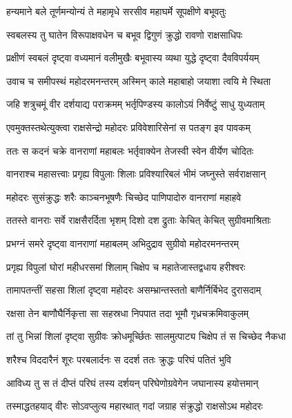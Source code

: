 
\twolineshloka
{हन्यमाने बले तूर्णमन्योन्यं ते महामृधे}
{सरसीव महाघर्मे सूपक्षीणे बभूवतुः} %

\twolineshloka
{स्वबलस्य तु घातेन विरूपाक्षवधेन च}
{बभूव द्विगुणं क्रुद्धो रावणो राक्षसाधिपः} %

\twolineshloka
{प्रक्षीणं स्वबलं दृष्ट्वा वध्यमानं वलीमुखैः}
{बभूवास्य व्यथा युद्धे दृष्ट्वा दैवविपर्ययम्} %

\twolineshloka
{उवाच च समीपस्थं महोदरमनन्तरम्}
{अस्मिन् काले महाबाहो जयाशा त्वयि मे स्थिता} %

\twolineshloka
{जहि शत्रुचमूं वीर दर्शयाद्य पराक्रमम्}
{भर्तृपिण्डस्य कालोऽयं निर्वेष्टुं साधु युध्यताम्} %

\twolineshloka
{एवमुक्तस्तथेत्युक्त्वा राक्षसेन्द्रो महोदरः}
{प्रविवेशारिसेनां स पतङ्ग इव पावकम्} %

\twolineshloka
{ततः स कदनं चक्रे वानराणां महाबलः}
{भर्तृवाक्येन तेजस्वी स्वेन वीर्येण चोदितः} %

\twolineshloka
{वानराश्च महासत्त्वाः प्रगृह्य विपुलाः शिलाः}
{प्रविश्यारिबलं भीमं जघ्नुस्ते सर्वराक्षसान्} %

\twolineshloka
{महोदरः सुसंक्रुद्धः शरैः काञ्चनभूषणैः}
{चिच्छेद पाणिपादोरु वानराणां महाहवे} %

\twolineshloka
{ततस्ते वानराः सर्वे राक्षसैरर्दिता भृशम्}
{दिशो दश द्रुताः केचित् केचित् सुग्रीवमाश्रिताः} %

\twolineshloka
{प्रभग्नं समरे दृष्ट्वा वानराणां महाबलम्}
{अभिदुद्राव सुग्रीवो महोदरमनन्तरम्} %

\twolineshloka
{प्रगृह्य विपुलां घोरां महीधरसमां शिलाम्}
{चिक्षेप च महातेजास्तद्वधाय हरीश्वरः} %

\twolineshloka
{तामापतन्तीं सहसा शिलां दृष्ट्वा महोदरः}
{असम्भ्रान्तस्ततो बाणैर्निर्बिभेद दुरासदाम्} %

\twolineshloka
{रक्षसा तेन बाणौघैर्निकृत्ता सा सहस्रधा}
{निपपात तदा भूमौ गृध्रचक्रमिवाकुलम्} %

\twolineshloka
{तां तु भिन्नां शिलां दृष्ट्वा सुग्रीवः क्रोधमूर्च्छितः}
{सालमुत्पाट्य चिक्षेप तं स चिच्छेद नैकधा} %

\twolineshloka
{शरैश्च विददारैनं शूरः परबलार्दनः}
{स ददर्श ततः क्रुद्धः परिघं पतितं भुवि} %

\twolineshloka
{आविध्य तु स तं दीप्तं परिघं तस्य दर्शयन्}
{परिघेणोग्रवेगेन जघानास्य हयोत्तमान्} %

\twolineshloka
{तस्माद्धतहयाद् वीरः सोऽवप्लुत्य महारथात्}
{गदां जग्राह संक्रुद्धो राक्षसोऽथ महोदरः} %

